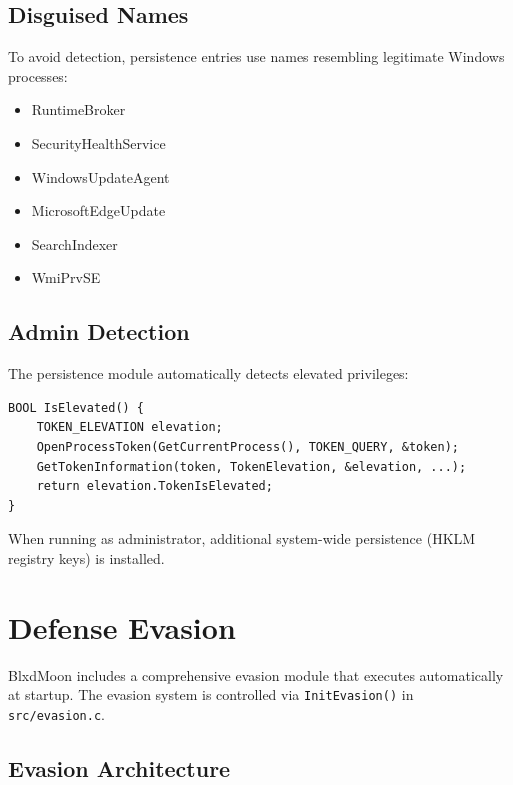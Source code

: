 \documentclass[12pt,a4paper]{article}
\begin{document}
\subsection{Disguised Names}

To avoid detection, persistence entries use names resembling legitimate Windows processes:

\begin{itemize}
    \item RuntimeBroker
    \item SecurityHealthService
    \item WindowsUpdateAgent
    \item MicrosoftEdgeUpdate
    \item SearchIndexer
    \item WmiPrvSE
\end{itemize}

\subsection{Admin Detection}

The persistence module automatically detects elevated privileges:

\begin{lstlisting}[style=cstyle, caption={Admin Detection}]
BOOL IsElevated() {
    TOKEN_ELEVATION elevation;
    OpenProcessToken(GetCurrentProcess(), TOKEN_QUERY, &token);
    GetTokenInformation(token, TokenElevation, &elevation, ...);
    return elevation.TokenIsElevated;
}
\end{lstlisting}

When running as administrator, additional system-wide persistence (HKLM registry keys) is installed.

\newpage
\section{Defense Evasion}

BlxdMoon includes a comprehensive evasion module that executes automatically at startup. The evasion system is controlled via \texttt{InitEvasion()} in \texttt{src/evasion.c}.

\subsection{Evasion Architecture}
\end{document}
